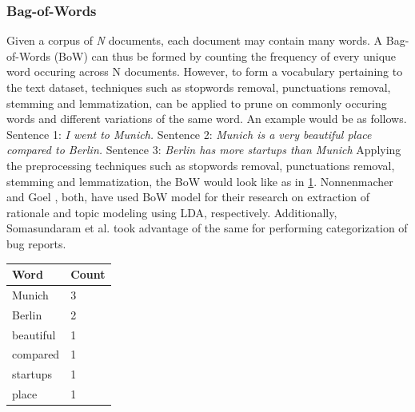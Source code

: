 \documentclass[a4paper,12pt,twoside]{report}
\begin{document}
\subsubsection{Bag-of-Words}
Given a corpus of \textit{N} documents, each document may contain many words. A Bag-of-Words (BoW) can thus be formed by counting the frequency of every unique word occuring across N documents. However, to form a vocabulary pertaining to the text dataset, techniques such as stopwords removal, punctuations removal, stemming and lemmatization, can be applied to prune on commonly occuring words and different variations of the same word. An example would be as follows.
\bigbreak
Sentence 1: \textit{I went to Munich.}
\bigbreak
Sentence 2: \textit{Munich is a very beautiful place compared to Berlin.}
\bigbreak
Sentence 3: \textit{Berlin has more startups than Munich}
\bigbreak
Applying the preprocessing techniques such as stopwords removal, punctuations removal, stemming and lemmatization, the BoW would look like as in \ref{tab:bowExample}. Nonnenmacher\cite{Nonnenmacher2017} and Goel \cite{Goel2017}, both, have used BoW model for their research on extraction of rationale and topic modeling using LDA, respectively. Additionally, Somasundaram et al. \cite{Somasundaram2012} took advantage of the same for performing categorization of bug reports.
\begin{table} %
    \centering
    \begin{adjustbox}{max width=\columnwidth}
    \def\arraystretch{1} %
    \begin{tabular}{p{2cm} p{2cm}}
        \toprule
        \textbf{Word} & \textbf{Count}\\
        \midrule
			Munich & 3 \\
			Berlin & 2 \\ 
			beautiful & 1 \\ 
			compared & 1 \\ 
			startups & 1 \\
			place & 1 \\ 
        \midrule
    \end{tabular}
    \end{adjustbox}
    \label{tab:bowExample}
\end{table}
\end{document}
